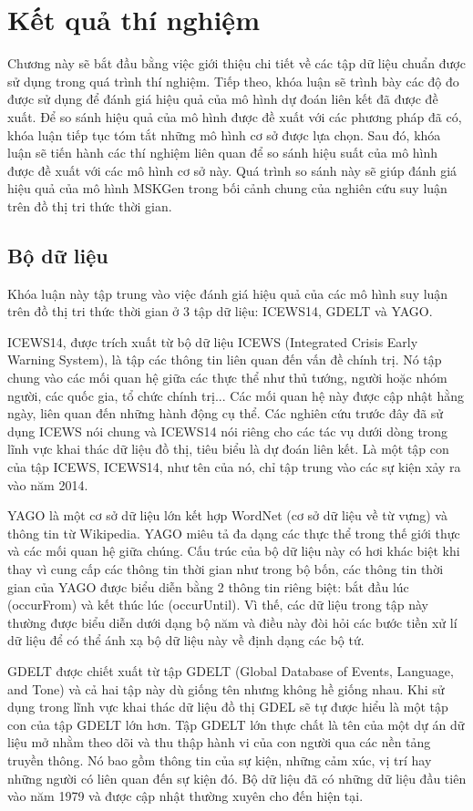 \chapter{Kết quả thí nghiệm}
\label{Chapter5}
Chương này sẽ bắt đầu bằng việc giới thiệu chi tiết về các tập dữ liệu
chuẩn được sử dụng trong quá trình thí nghiệm. Tiếp theo, khóa luận sẽ
trình bày các độ đo được sử dụng để đánh giá hiệu quả của mô hình dự
đoán liên kết đã được đề xuất. Để so sánh hiệu quả của mô hình được
đề xuất với các phương pháp đã có, khóa luận tiếp tục tóm tắt những mô
hình cơ sở được lựa chọn. Sau đó, khóa luận sẽ tiến hành các thí nghiệm liên quan để so sánh hiệu suất của mô hình được đề xuất với các mô hình cơ sở này. Quá trình so sánh này sẽ giúp đánh giá hiệu quả của mô hình MSKGen trong bối cảnh chung của nghiên cứu suy luận trên đồ thị tri thức thời gian.

\section{Bộ dữ liệu}
Khóa luận này tập trung vào việc đánh giá hiệu quả của các mô hình suy luận trên đồ thị tri thức thời gian ở 3 tập dữ liệu: ICEWS14, GDELT và YAGO. 

ICEWS14, được trích xuất từ bộ dữ liệu ICEWS (Integrated Crisis Early Warning System), là tập các thông tin liên quan đến vấn đề chính trị. Nó tập chung vào các mối quan hệ giữa các thực thể như thủ tướng, người hoặc nhóm người, các quốc gia, tổ chức chính trị... Các mối quan hệ này được cập nhật hằng ngày, liên quan đến những hành động cụ thể. Các nghiên cứu trước đây đã sử dụng ICEWS nói chung và ICEWS14 nói riêng cho các tác vụ dưới dòng trong lĩnh vực khai thác dữ liệu đồ thị, tiêu biểu là dự đoán liên kết. Là một tập con của tập ICEWS, ICEWS14, như tên của nó, chỉ tập trung vào các sự kiện xảy ra vào năm 2014.

YAGO là một cơ sở dữ liệu lớn kết hợp WordNet (cơ sở dữ liệu về từ vựng) và thông tin từ Wikipedia. YAGO miêu tả đa dạng các thực thể
trong thế giới thực và các mối quan hệ giữa chúng. Cấu trúc của bộ dữ liệu này có hơi khác biệt khi thay vì cung cấp các thông tin thời gian như trong bộ bốn, các thông tin thời gian của YAGO được biểu diễn bằng 2 thông tin riêng biệt: bắt đầu lúc (occurFrom) và kết thúc lúc (occurUntil). Vì thế, các dữ liệu trong tập này thường được biểu diễn dưới dạng bộ năm và điều này đòi hỏi các bước tiền xử lí dữ liệu để có thể ánh xạ bộ dữ liệu này về định dạng các bộ tứ.

 GDELT được chiết xuất từ tập GDELT (Global Database of Events, Language, and Tone) và cả hai tập này dù giống tên nhưng không hề giống nhau. Khi sử dụng trong lĩnh vực khai thác dữ liệu đồ thị GDEL sẽ tự được hiểu là một tập con của tập GDELT lớn hơn. Tập GDELT lớn thực chất là tên của một dự án dữ liệu mở nhằm theo dõi và thu thập hành vi của con người qua các nền tảng truyền thông. Nó bao gồm thông tin của sự kiện, những cảm xúc, vị trí hay những người có liên quan đến sự kiện đó. Bộ dữ liệu đã có những dữ liệu đầu tiên vào năm 1979 và được cập nhật thường xuyên cho đến hiện tại.

